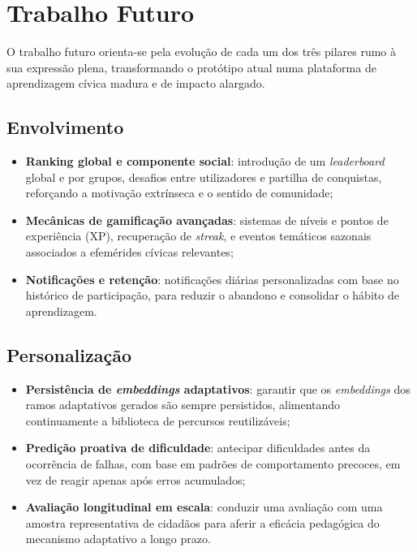 \section{Trabalho Futuro}
\label{sec:trabalho_futuro}

O trabalho futuro orienta-se pela evolução de cada um dos três pilares rumo à sua expressão plena, transformando o protótipo atual numa plataforma de aprendizagem cívica madura e de impacto alargado.

\subsection*{Envolvimento}

\begin{itemize}
  \item \textbf{Ranking global e componente social}: introdução de um \textit{leaderboard} global e por grupos, desafios entre utilizadores e partilha de conquistas, reforçando a motivação extrínseca e o sentido de comunidade;
  \item \textbf{Mecânicas de gamificação avançadas}: sistemas de níveis e pontos de experiência (XP), recuperação de \textit{streak}, e eventos temáticos sazonais associados a efemérides cívicas relevantes;
  \item \textbf{Notificações e retenção}: notificações diárias personalizadas com base no histórico de participação, para reduzir o abandono e consolidar o hábito de aprendizagem.
\end{itemize}

\subsection*{Personalização}

\begin{itemize}
  \item \textbf{Persistência de \textit{embeddings} adaptativos}: garantir que os \textit{embeddings} dos ramos adaptativos gerados são sempre persistidos, alimentando continuamente a biblioteca de percursos reutilizáveis;
  \item \textbf{Predição proativa de dificuldade}: antecipar dificuldades antes da ocorrência de falhas, com base em padrões de comportamento precoces, em vez de reagir apenas após erros acumulados;
  \item \textbf{Avaliação longitudinal em escala}: conduzir uma avaliação com uma amostra representativa de cidadãos para aferir a eficácia pedagógica do mecanismo adaptativo a longo prazo.
\end{itemize}

